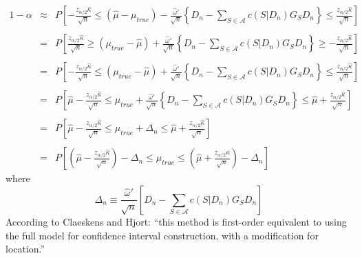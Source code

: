 	\begin{eqnarray*}
		1-\alpha&\approx&P \left[-\frac{z_{\alpha/2}\widehat{\kappa}}{\sqrt{n}} \leq (\hat{\mu} - \mu_{true})  - \frac{\widehat{\omega}'}{\sqrt{n}}\left\{D_n -  \sum_{S\in \mathcal{A}} c(S|D_n)G_S D_n \right\} \leq\frac{z_{\alpha/2}\widehat{\kappa}}{\sqrt{n}} \right]\\\\
	&=&P \left[\frac{z_{\alpha/2}\widehat{\kappa}}{\sqrt{n}} \geq (\mu_{true} - \hat{\mu})  + \frac{\widehat{\omega}'}{\sqrt{n}}\left\{D_n -  \sum_{S\in \mathcal{A}} c(S|D_n)G_S D_n \right\} \geq -\frac{z_{\alpha/2}\widehat{\kappa}}{\sqrt{n}} \right]\\ \\
	&=&P \left[-\frac{z_{\alpha/2}\widehat{\kappa}}{\sqrt{n}} \leq (\mu_{true} - \hat{\mu})  + \frac{\widehat{\omega}'}{\sqrt{n}}\left\{D_n -  \sum_{S\in \mathcal{A}} c(S|D_n)G_S D_n \right\} \leq \frac{z_{\alpha/2}\widehat{\kappa}}{\sqrt{n}} \right]\\\\
	&=&P \left[\hat{\mu}-\frac{z_{\alpha/2}\widehat{\kappa}}{\sqrt{n}} \leq \mu_{true}  + \frac{\widehat{\omega}'}{\sqrt{n}}\left\{D_n -  \sum_{S\in \mathcal{A}} c(S|D_n)G_S D_n \right\} \leq \hat{\mu} + \frac{z_{\alpha/2}\widehat{\kappa}}{\sqrt{n}} \right]\\\\
	&=&P \left[\hat{\mu}-\frac{z_{\alpha/2}\widehat{\kappa}}{\sqrt{n}} \leq \mu_{true}  + \Delta_n\leq \hat{\mu} + \frac{z_{\alpha/2}\widehat{\kappa}}{\sqrt{n}} \right]\\\\
	&=&P \left[\left(\hat{\mu}-\frac{z_{\alpha/2}\widehat{\kappa}}{\sqrt{n}}\right) - \Delta_n \leq \mu_{true}  \leq \left(\hat{\mu} + \frac{z_{\alpha/2}\widehat{\kappa}}{\sqrt{n}}\right) - \Delta_n \right]
\end{eqnarray*}
where
	$$\Delta_n \equiv \frac{\widehat{\omega}'}{\sqrt{n}}\left[D_n -  \sum_{S\in \mathcal{A}} c(S|D_n)G_S D_n \right]$$
According to Claeskens and Hjort: ``this method is first-order equivalent to using the full model for confidence interval construction, with a modification for location.''





